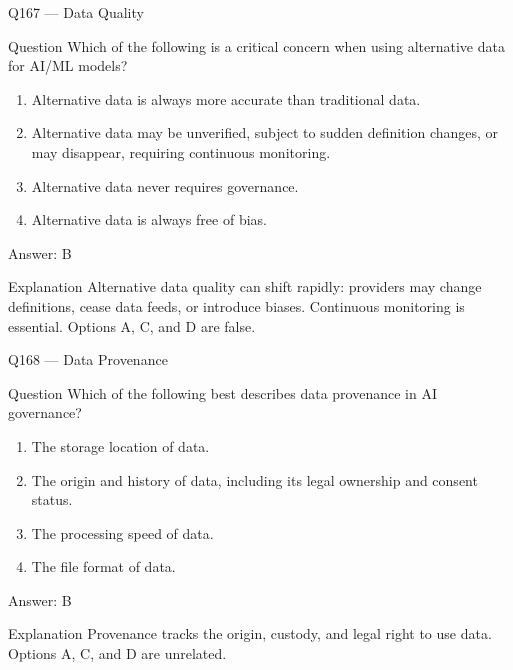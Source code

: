 \documentclass[aspectratio=169,8pt]{beamer}
\begin{document}
\begin{frame}{Q167 --- Data Quality}
\begin{block}{Question}
Which of the following is a critical concern when using alternative data for AI/ML models?
\begin{enumerate}
\item Alternative data is always more accurate than traditional data.
\item Alternative data may be unverified, subject to sudden definition changes, or may disappear, requiring continuous monitoring.
\item Alternative data never requires governance.
\item Alternative data is always free of bias.
\end{enumerate}  \end{block}
\begin{exampleblock}{Answer: B}\end{exampleblock}
\begin{block}{Explanation}
Alternative data quality can shift rapidly: providers may change definitions, cease data feeds, or introduce biases. Continuous monitoring is essential. Options A, C, and D are false.
\end{block}
\end{frame}

\begin{frame}{Q168 --- Data Provenance}
\begin{block}{Question}
Which of the following best describes data provenance in AI governance?
\begin{enumerate}
\item The storage location of data.
\item The origin and history of data, including its legal ownership and consent status.
\item The processing speed of data.
\item The file format of data.
\end{enumerate}  \end{block}
\begin{exampleblock}{Answer: B}\end{exampleblock}
\begin{block}{Explanation}
Provenance tracks the origin, custody, and legal right to use data. Options A, C, and D are unrelated.
\end{block}
\end{frame}
\end{document}
